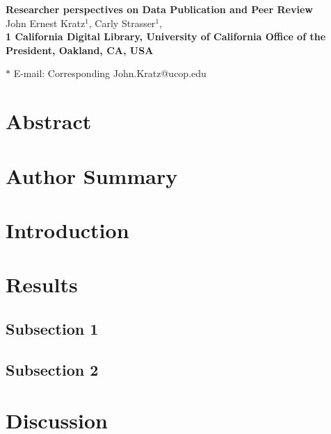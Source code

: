 \documentclass[10pt]{article}
\date{}
\begin{document}
\begin{flushleft}
{\Large
\textbf{Researcher perspectives on Data Publication and Peer Review}
}
\\
John Ernest Kratz$^{1}$, 
Carly Strasser$^{1}$, 
\\
\bf{1} California Digital Library, University of California Office of the President, Oakland, CA, USA

$\ast$ E-mail: Corresponding John.Kratz@ucop.edu
\end{flushleft}

\section*{Abstract}

\section*{Author Summary}

\section*{Introduction}

\section*{Results}

\subsection*{Subsection 1}

\subsection*{Subsection 2}

\section*{Discussion}

\end{document}
